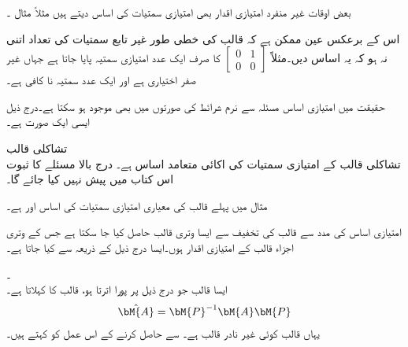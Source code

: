 بعض اوقات غیر منفرد امتیازی اقدار بھی امتیازی سمتیات کی اساس دیتے ہیں مثلاً مثال ۔

اس کے برعکس عین ممکن ہے کہ قالب کی خطی طور غیر تابع سمتیات کی تعداد اتنی نہ ہو کہ یہ اساس دیں۔مثلاً 
$[\begin{smallmatrix} 0&1\\0&0  \end{smallmatrix}]$
کا صرف ایک عدد امتیازی سمتیہ  پایا جاتا ہے جہاں  غیر صفر اختیاری ہے اور ایک عدد سمتیہ نا کافی ہے۔ 

حقیقت میں امتیازی اساس مسئلہ  سے نرم شرائط کی صورتوں میں بھی موجود ہو سکتا ہے۔درج ذیل ایسی ایک صورت ہے۔

\quad تشاکلی قالب\\
تشاکلی قالب کے امتیازی سمتیات  کی  اکائی متعامد  اساس  ہے۔  
درج بالا مسئلے کا ثبوت اس کتاب میں پیش نہیں کیا جائے گا۔

مثال  میں پہلے قالب کی معیاری امتیازی سمتیات کی اساس  اور
  ہے۔  

 امتیازی اساس کی مدد سے  قالب  کی تخفیف سے ایسا  وتری قالب حاصل کیا جا سکتا ہے جس کے وتری اجزاء قالب  کے امتیازی اقدار ہوں۔ایسا درج ذیل  کے ذریعہ سے کیا جاتا ہے۔

\quad {}۔ \\
ایسا  قالب  جو درج ذیل پر پورا اترتا ہو،  قالب  کا  کہلاتا ہے۔
\begin{align}
\hat{\bM{A}}=\bM{P}^{-1}\bM{A}\bM{P}
\end{align}
یہاں  قالب  کوئی غیر نادر قالب ہے۔ سے  حاصل کرنے کے اس عمل کو  کہتے ہیں۔

